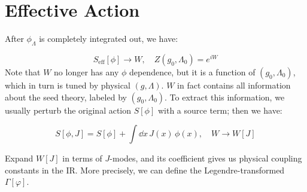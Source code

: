 \documentclass[a4paper
	,10pt
]{article}
\begin{document}
\section{Effective Action}
	After $\phi_\Lambda$ is completely integrated out, we
	have:
	
	\begin{equation}
	  S_{\mathrm{eff}}[\phi] \to W,\quad
	  Z(g_0,\Lambda_0) = e^{iW}
	\end{equation}
	Note that $W$ no longer has any $\phi$ dependence, but it is a
	function of $(g_0,\Lambda_0)$, which in turn is tuned by physical
	$(g,\Lambda)$. $W$ in fact contains all information about the seed
	theory, labeled by $(g_0,\Lambda_0)$. To extract this information, we
	usually perturb the original action $S[\phi]$ with a source term; then
	we have:
	
	\begin{equation}
	  S[\phi,J]
	  = S[\phi] + \int \dd{x}\,J(x)\,\phi(x),\quad
	  W \to W[J]
	\end{equation}
	
	Expand $W[J]$ in terms of $J$-modes, and its coefficient gives us
	physical coupling constants in the IR. More precisely, we can define the Legendre-transformed $\Gamma[\varphi]$.


\printbibliography[%
	,heading = bibintoc
]
\end{document}
